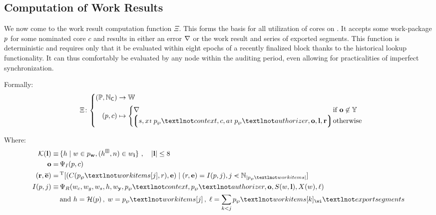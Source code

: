 \subsection{Computation of Work Results}\label{sec:computeworkresult}

We now come to the work result computation function $\Xi$. This forms the basis for all utilization of cores on \Jam. It accepts some work-package $p$ for some nominated core $c$ and results in either an error $\nabla$ or the work result and series of exported segments. This function is deterministic and requires only that it be evaluated within eight epochs of a recently finalized block thanks to the historical lookup functionality. It can thus comfortably be evaluated by any node within the auditing period, even allowing for practicalities of imperfect synchronization.

Formally:
\begin{equation}\label{eq:workresultfunction}
  \!\!\Xi \colon \left\{\begin{aligned}
    (\mathbb{P}, \N_\mathsf{C}) &\to \mathbb{W} \\
    (\wpX, c) &\mapsto \begin{cases}
        \error &\when \mathbf{o} \not\in \Y \\
        \tup{s, \is{x}{\wpX_\wp¬context}, c, \is{a}{\wpX_\wp¬authorizer}, \mathbf{o}, \mathbf{l}, \mathbf{r}} \!\!\!\!\!&\otherwise
    \end{cases}
  \end{aligned}\right.\!\!\!\!\!\!\!
\end{equation}

Where:
\begin{align*}
  \keys{\mathbf{l}} \equiv \,&\{ h \mid w \in p_\mathbf{w}, (h^\boxplus, n) \in w_\mathbf{i} \} \ ,\quad|\mathbf{l}| \le 8\\
  \mathbf{o} = \,&\Psi_I(\wpX, c) \\
  (\mathbf{r}, \overline{\mathbf{e}}) = \,&\transpose[
    (\itemtoresult(\wpX_\wp¬workitems[j], r), \mathbf{e})
    \mid
    (r, \mathbf{e}) = \countupexports(\wpX, j),
    j \orderedin \N_{|\wpX_\wp¬workitems|}
  ] \\
  \countupexports(\wpX, j) \equiv \,&\Psi_R(
    \wiX_c,
    \wiX_g,
    \wiX_s,
    h,
    \wiX_\mathbf{y},
    \wpX_\wp¬context,
    \wpX_\wp¬authorizer,
    \mathbf{o},
    \importsegmentdata(w, \mathbf{l}),
    \extrinsicdata(w),
    \ell
  )\\
  &\also h = \mathcal{H}(\wpX)\,,\; w = \wpX_\wp¬workitems[j]\,,\; \ell = \sum_{k < j}\wpX_\wp¬workitems[k]_\wi¬exportsegments
\end{align*}

